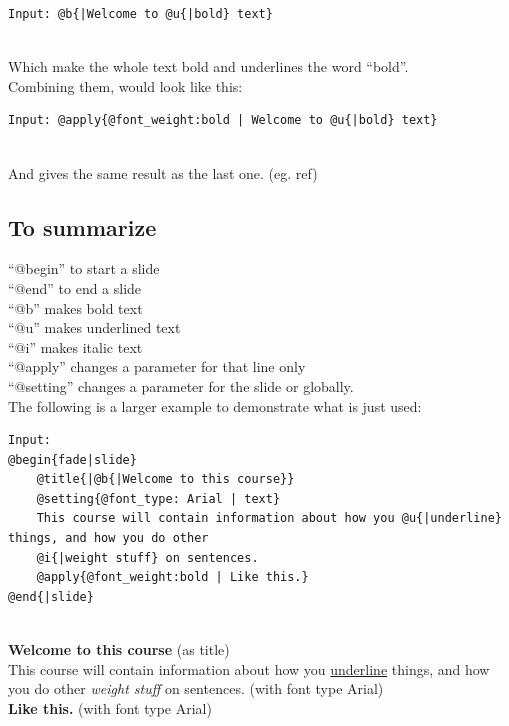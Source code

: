 \begin{lstlisting}[frame=single]
Input: @b{|Welcome to @u{|bold} text}
\end{lstlisting}

 \\

Which make the whole text bold and underlines the word ``bold''.\\

Combining them, would look like this:\\

\begin{lstlisting}[frame=single]
Input: @apply{@font_weight:bold | Welcome to @u{|bold} text}
\end{lstlisting}

 \\

And gives the same result as the last one. (eg. ref)

\subsection*{To summarize}
``@begin'' to start a slide\\
``@end'' to end a slide\\
``@b'' makes bold text \\
``@u'' makes underlined text \\
``@i'' makes italic text \\
``@apply'' changes a parameter for that line only\\
``@setting'' changes a parameter for the slide or globally.\\

The following is a larger example to demonstrate what is just used:\\

\begin{lstlisting}[frame=single]
Input:
@begin{fade|slide}
    @title{|@b{|Welcome to this course}}
    @setting{@font_type: Arial | text}
    This course will contain information about how you @u{|underline} things, and how you do other    
    @i{|weight stuff} on sentences.
    @apply{@font_weight:bold | Like this.}
@end{|slide}
\end{lstlisting}

 \\
\textbf{Welcome to this course} (as title) \\
This course will contain information about how you \underline{underline} things, and how you do other \textit{weight stuff} on sentences. (with font type Arial) \\
\textbf{Like this.}  (with font type Arial)
\\ \\

